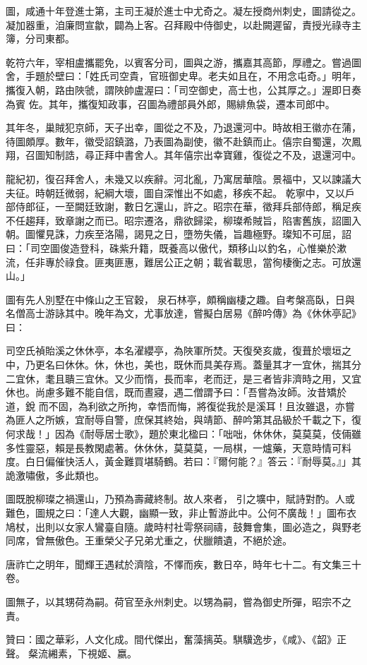 \begin{pinyinscope}
 圖，咸通十年登進士第，主司王凝於進士中尤奇之。凝左授商州刺史，圖請從之。凝加器重，洎廉問宣歙，闢為上客。召拜殿中侍御史，以赴闕遲留，責授光祿寺主簿，分司東都。



 乾符六年，宰相盧攜罷免，以賓客分司，圖與之游，攜嘉其高節，厚禮之。嘗過圖舍，手題於壁曰：「姓氏司空貴，官班御史卑。老夫如且在，不用念屯奇。」明年，攜復入朝，路由陜虢，謂陜帥盧渥曰：「司空御史，高士也，公其厚之。」渥即日奏為賓
 佐。其年，攜復知政事，召圖為禮部員外郎，賜緋魚袋，遷本司郎中。



 其年冬，巢賊犯京師，天子出幸，圖從之不及，乃退還河中。時故相王徽亦在蒲，待圖頗厚。數年，徽受詔鎮潞，乃表圖為副使，徽不赴鎮而止。僖宗自蜀還，次鳳翔，召圖知制誥，尋正拜中書舍人。其年僖宗出幸寶雞，復從之不及，退還河中。



 龍紀初，復召拜舍人，未幾又以疾辭。河北亂，乃寓居華陰。景福中，又以諫議大夫征。時朝廷微弱，紀綱大壞，圖自深惟出不如處，移疾不起。
 乾寧中，又以戶部侍郎征，一至闕廷致謝，數日乞還山，許之。昭宗在華，徵拜兵部侍郎，稱足疾不任趨拜，致章謝之而已。昭宗遷洛，鼎欲歸梁，柳璨希賊旨，陷害舊族，詔圖入朝。圖懼見誅，力疾至洛陽，謁見之日，墮笏失儀，旨趣極野。璨知不可屈，詔曰：「司空圖俊造登科，硃紫升籍，既養高以傲代，類移山以釣名，心惟樂於漱流，任非專於祿食。匪夷匪惠，難居公正之朝；載省載思，當徇棲衡之志。可放還山。」



 圖有先人別墅在中條山之王官穀，
 泉石林亭，頗稱幽棲之趣。自考槃高臥，日與名僧高士游詠其中。晚年為文，尤事放達，嘗擬白居易《醉吟傳》為《休休亭記》曰：



 司空氏禎貽溪之休休亭，本名濯纓亭，為陜軍所焚。天復癸亥歲，復葺於壞垣之中，乃更名曰休休。休，休也，美也，既休而具美存焉。蓋量其才一宜休，揣其分二宜休，耄且聵三宜休。又少而惰，長而率，老而迂，是三者皆非濟時之用，又宜休也。尚慮多難不能自信，既而晝寢，遇二僧謂予曰：「吾嘗為汝師。汝昔矯於道，銳
 而不固，為利欲之所拘，幸悟而悔，將復從我於是溪耳！且汝雖退，亦嘗為匪人之所嫉，宜耐辱自警，庶保其終始，與靖節、醉吟第其品級於千載之下，復何求哉！」因為《耐辱居士歌》，題於東北楹曰：「咄咄，休休休，莫莫莫，伎倆雖多性靈惡，賴是長教閑處著。休休休，莫莫莫，一局棋，一爐藥，天意時情可料度。白日偏催快活人，黃金難買堪騎鶴。若曰：『爾何能？』答云：『耐辱莫。』」其詭激嘯傲，多此類也。



 圖既脫柳璨之禍還山，乃預為壽藏終制。故人來者，
 引之壙中，賦詩對酌。人或難色，圖規之曰：「達人大觀，幽顯一致，非止暫游此中。公何不廣哉！」圖布衣鳩杖，出則以女家人鸞臺自隨。歲時村社雩祭祠禱，鼓舞會集，圖必造之，與野老同席，曾無傲色。王重榮父子兄弟尤重之，伏臘饋遺，不絕於途。



 唐祚亡之明年，聞輝王遇弒於濟陰，不懌而疾，數日卒，時年七十二。有文集三十卷。



 圖無子，以其甥荷為嗣。荷官至永州刺史。以甥為嗣，嘗為御史所彈，昭宗不之責。



 贊曰：國之華彩，人文化成。間代傑出，奮藻摛英。騏驥逸步，《咸》、《韶》正聲。粲流緗素，下視姬、嬴。



\end{pinyinscope}